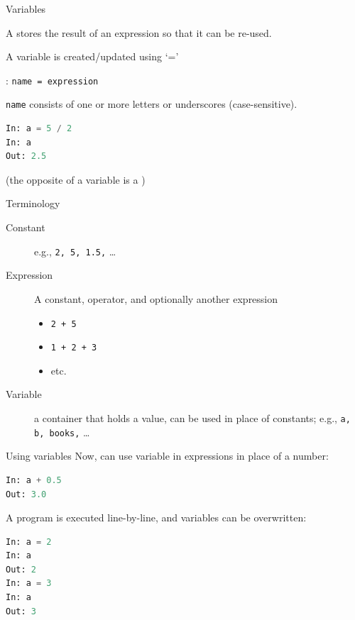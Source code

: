 \documentclass[aspectratio=169,usenames,dvipsnames]{beamer}
\begin{document}
\begin{frame}[fragile]{Variables}
    \begin{definition}
        A  stores the result of an expression
        so that it can be re-used.
    \end{definition}

A variable is created/updated using `='

\begin{definition}
: \lstinline{name = expression}

\lstinline{name} consists of one or more letters or underscores (case-sensitive).
\end{definition}

\begin{lstlisting}[language=python]
In: a = 5 / 2
In: a
Out: 2.5
\end{lstlisting}

(the opposite of a variable is a )
\end{frame}

\begin{frame}{Terminology}
    \begin{description}
        \item[Constant]
            e.g., \lstinline{2, 5, 1.5,} \dots
        \item[Expression]
            A constant, operator, and optionally another expression
            \begin{itemize}
                \item \lstinline{2 + 5}
                \item \lstinline{1 + 2 + 3}
                \item etc.
            \end{itemize}
        \item[Variable] a container that holds a value,
            can be used in place of constants;
            e.g., \lstinline{a, b, books,} \dots
    \end{description}
\end{frame}

\begin{frame}[fragile]{Using variables}
Now, can use variable in expressions in place of a number:

\begin{lstlisting}[language=python]
In: a + 0.5
Out: 3.0
\end{lstlisting}

\pause
A program is executed line-by-line, and variables can be overwritten:
\begin{lstlisting}[language=python]
In: a = 2
In: a
Out: 2
In: a = 3
In: a
Out: 3
\end{lstlisting}
\end{frame}
\end{document}
